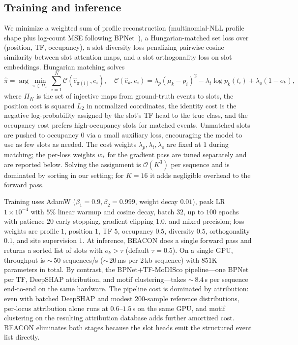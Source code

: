 \documentclass{article}
\begin{document}
\subsection{Training and inference}
We minimize a weighted sum of profile reconstruction (multinomial-NLL profile shape plus log-count MSE following BPNet~\citep{avsec2021bpnet}), a Hungarian-matched set loss over (position, TF, occupancy), a slot diversity loss penalizing pairwise cosine similarity between slot attention maps, and a slot orthogonality loss on slot embeddings. Hungarian matching solves
\begin{equation}
\hat{\pi}=\arg\min_{\pi\in\Pi_K}\sum_{i=1}^{N}\mathcal{C}(\hat{e}_{\pi(i)},e_i),
\quad \mathcal{C}(\hat{e}_k, e_i)=\lambda_p (\mu_k - p_i)^2 - \lambda_t \log p_k(t_i) + \lambda_o (1 - o_k),
\end{equation}
where $\Pi_K$ is the set of injective maps from ground-truth events to slots, the position cost is squared $L_2$ in normalized coordinates, the identity cost is the negative log-probability assigned by the slot's TF head to the true class, and the occupancy cost prefers high-occupancy slots for matched events. Unmatched slots are pushed to occupancy $0$ via a small auxiliary loss, encouraging the model to use as few slots as needed. The cost weights $\lambda_p, \lambda_t, \lambda_o$ are fixed at $1$ during matching; the per-loss weights $w_*$ for the gradient pass are tuned separately and are reported below. Solving the assignment is $\mathcal{O}(K^3)$ per sequence and is dominated by sorting in our setting; for $K{=}16$ it adds negligible overhead to the forward pass.

Training uses AdamW ($\beta_1{=}0.9,\beta_2{=}0.999$, weight decay $0.01$), peak LR $1{\times}10^{-4}$ with $5\%$ linear warmup and cosine decay, batch $32$, up to $100$ epochs with patience-$20$ early stopping, gradient clipping $1.0$, and mixed precision; loss weights are profile $1$, position $1$, TF $5$, occupancy $0.5$, diversity $0.5$, orthogonality $0.1$, and site supervision $1$. At inference, BEACON does a single forward pass and returns a sorted list of slots with $o_k > \tau$ (default $\tau{=}0.5$). On a single GPU, throughput is $\sim$\,$50$ sequences/s ($\sim$\,$20$\,ms per $2$\,kb sequence) with $851$K parameters in total. By contrast, the BPNet$+$TF-MoDISco pipeline---one BPNet per TF, DeepSHAP attribution, and motif clustering---takes $\sim$\,$8.4$\,s per sequence end-to-end on the same hardware. The pipeline cost is dominated by attribution: even with batched DeepSHAP and modest $200$-sample reference distributions, per-locus attribution alone runs at $0.6$--$1.5$\,s on the same GPU, and motif clustering on the resulting attribution database adds further amortized cost. BEACON eliminates both stages because the slot heads emit the structured event list directly.
\end{document}
